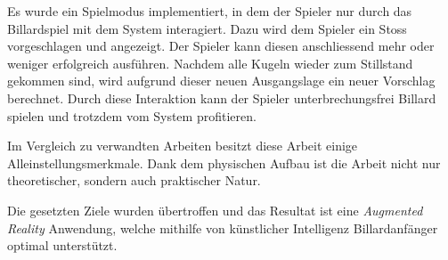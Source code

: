 Es wurde ein Spielmodus implementiert, in dem der Spieler nur durch das Billardspiel mit dem System interagiert.
Dazu wird dem Spieler ein Stoss vorgeschlagen und angezeigt.
Der Spieler kann diesen anschliessend mehr oder weniger erfolgreich ausführen.
Nachdem alle Kugeln wieder zum Stillstand gekommen sind, wird aufgrund dieser neuen Ausgangslage ein neuer Vorschlag berechnet.
Durch diese Interaktion kann der Spieler unterbrechungsfrei Billard spielen und trotzdem vom System profitieren.

Im Vergleich zu verwandten Arbeiten besitzt diese Arbeit einige Alleinstellungsmerkmale.
Dank dem physischen Aufbau ist die Arbeit nicht nur theoretischer, sondern auch praktischer Natur.

Die gesetzten Ziele wurden übertroffen und das Resultat ist eine \emph{Augmented Reality} Anwendung,
welche mithilfe von künstlicher Intelligenz Billardanfänger optimal unterstützt.
